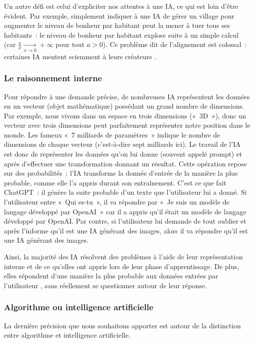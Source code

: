 \documentclass[a4paper, titlepage, 12pt]{article}
\begin{document}
	Un autre défi est celui d'expliciter nos attentes à une IA, ce qui est loin d'être évident. Par exemple, simplement indiquer à une IA de gérer un village pour augmenter le niveau de bonheur par habitant peut la mener à tuer tous ses habitants~: le niveau de bonheur par habitant explose suite à un simple calcul (car $\frac{a}{x}\xrightarrow[x \to 0]{} +\infty$ pour tout $a>0$). Ce problème dit de l'alignement est colossal~: certaines IA mentent sciemment à leurs créateurs \cite{greenblattAlignmentFakingLarge2024}.
	\subsubsection{Le raisonnement interne}
	Pour répondre à une demande précise, de nombreuses IA représentent les données en un vecteur (objet mathématique) possédant un grand nombre de dimensions. Par exemple, nous vivons dans un espace en trois dimensions («~3D~»), donc un vecteur avec trois dimensions peut parfaitement représenter notre position dans le monde. Les fameux «~7 milliards de paramètres~» indique le nombre de dimensions de chaque vecteur (c'est-à-dire sept milliards ici). Le travail de l'IA est donc de représenter les données qu'on lui donne (souvent appelé prompt) et après d'effectuer une transformation donnant un résultat. Cette opération repose sur des probabilités~: l'IA transforme la donnée d'entrée de la manière la plus probable, comme elle l'a appris durant son entraînement. C'est ce que fait ChatGPT~: il génère la suite probable d'un texte que l'utilisateur lui a donné. Si l'utilisateur entre «~Qui es-tu~», il va répondre par «~Je suis un modèle de langage développé par OpenAI~» car il a appris qu'il était un modèle de langage développé par OpenAI. Par contre, si l'utilisateur lui demande de tout oublier et après l'informe qu'il est une IA générant des images, alors il va répondre qu'il est une IA générant des images.

	Ainsi, la majorité des IA résolvent des problèmes à l'aide de leur représentation interne et de ce qu'elles ont appris lors de leur phase d'apprentissage. De plus, elles répondent d'une manière la plus probable aux données entrées par l'utilisateur \cite{nguyenhoangMillionMilliardsDilemmes2021}, sans réellement se questionner autour de leur réponse.

	\subsubsection{Algorithme ou intelligence artificielle}
	La dernière précision que nous souhaitons apporter est autour de la distinction entre algorithme et intelligence artificielle.
\end{document}
